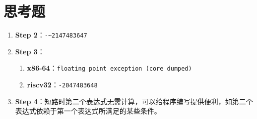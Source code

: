 \documentclass[a4paper]{article}
\begin{document}
\section{思考题}

\begin{enumerate}
    \item \textbf{Step 2}：\texttt{-\textasciitilde2147483647}
    \item \textbf{Step 3}：\begin{enumerate}
        \item \textbf{x86-64}：\texttt{floating point exception (core dumped)}
        \item \textbf{riscv32}：\texttt{-2047483648}
    \end{enumerate}
    \item \textbf{Step 4}：短路时第二个表达式无需计算，可以给程序编写提供便利，如第二个表达式依赖于第一个表达式所满足的某些条件。
\end{enumerate}
\end{document}
